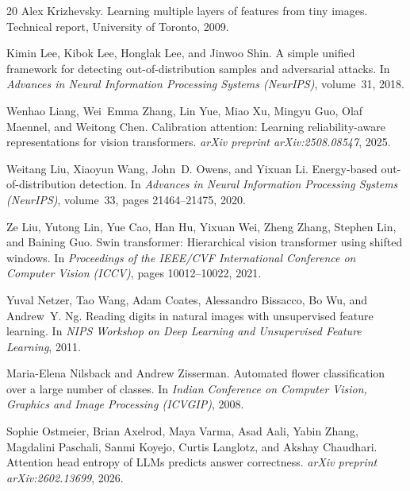 \documentclass{article}
\begin{document}
\begin{thebibliography}{20}
Alex Krizhevsky.
\newblock Learning multiple layers of features from tiny images.
\newblock Technical report, University of Toronto, 2009.

Kimin Lee, Kibok Lee, Honglak Lee, and Jinwoo Shin.
\newblock A simple unified framework for detecting out-of-distribution samples and adversarial attacks.
\newblock In \emph{Advances in Neural Information Processing Systems (NeurIPS)}, volume~31, 2018.

Wenhao Liang, Wei~Emma Zhang, Lin Yue, Miao Xu, Mingyu Guo, Olaf Maennel, and Weitong Chen.
\newblock Calibration attention: Learning reliability-aware representations for vision transformers.
\newblock \emph{arXiv preprint arXiv:2508.08547}, 2025.

Weitang Liu, Xiaoyun Wang, John~D. Owens, and Yixuan Li.
\newblock Energy-based out-of-distribution detection.
\newblock In \emph{Advances in Neural Information Processing Systems (NeurIPS)}, volume~33, pages 21464--21475, 2020.

Ze Liu, Yutong Lin, Yue Cao, Han Hu, Yixuan Wei, Zheng Zhang, Stephen Lin, and Baining Guo.
\newblock Swin transformer: Hierarchical vision transformer using shifted windows.
\newblock In \emph{Proceedings of the IEEE/CVF International Conference on Computer Vision (ICCV)}, pages 10012--10022, 2021.

Yuval Netzer, Tao Wang, Adam Coates, Alessandro Bissacco, Bo Wu, and Andrew~Y. Ng.
\newblock Reading digits in natural images with unsupervised feature learning.
\newblock In \emph{NIPS Workshop on Deep Learning and Unsupervised Feature Learning}, 2011.

Maria-Elena Nilsback and Andrew Zisserman.
\newblock Automated flower classification over a large number of classes.
\newblock In \emph{Indian Conference on Computer Vision, Graphics and Image Processing (ICVGIP)}, 2008.

Sophie Ostmeier, Brian Axelrod, Maya Varma, Asad Aali, Yabin Zhang, Magdalini Paschali, Sanmi Koyejo, Curtis Langlotz, and Akshay Chaudhari.
\newblock Attention head entropy of LLMs predicts answer correctness.
\newblock \emph{arXiv preprint arXiv:2602.13699}, 2026.


\end{thebibliography}
\end{document}
